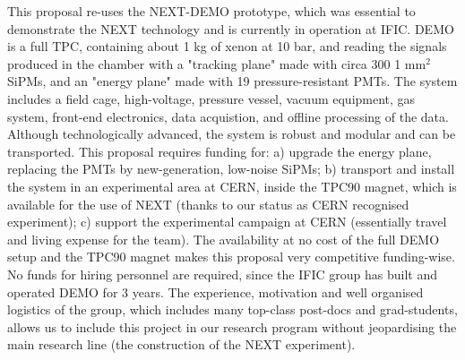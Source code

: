 \noindent This proposal re-uses the NEXT-DEMO prototype, which was essential to demonstrate the NEXT technology and is currently in operation at IFIC. DEMO is a full TPC, containing about 1 kg of xenon at 10 bar, and reading the signals produced in the chamber with a "tracking plane" made with circa 300 1 mm$^2$ SiPMs, and an "energy plane" made with 19 pressure-resistant PMTs. The system includes a field cage, high-voltage, pressure vessel, vacuum equipment, gas system, front-end electronics, data acquistion, and offline processing of the data. Although technologically advanced, the system is robust and modular and can be transported. This proposal requires funding for: a) upgrade the energy plane, replacing the PMTs by new-generation, low-noise SiPMs;  b) transport and install the system in an experimental area at CERN, inside the TPC90 magnet, which is available for the use of NEXT (thanks to our status as CERN recognised experiment); c) support the experimental campaign at CERN (essentially travel and living expense for the team). The availability at no cost of the full DEMO setup and the TPC90 magnet makes this proposal very competitive funding-wise. No funds for hiring personnel are required, since the IFIC group has built and operated DEMO for 3 years. The experience, motivation and well organised logistics of the group, which includes many top-class post-docs and grad-students, allows us to include this project in our research program without jeopardising the main research line (the construction of the NEXT experiment).  



